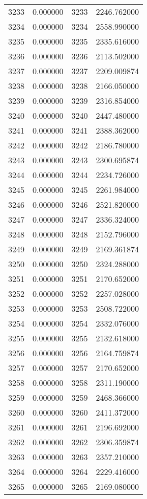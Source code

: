 \documentclass[12pt]{article}
\begin{document}
\begin{longtable}{@{}cccc@{}}
3233 & 0.000000 & 3233 & 2246.762000 \\
3234 & 0.000000 & 3234 & 2558.990000 \\
3235 & 0.000000 & 3235 & 2335.616000 \\
3236 & 0.000000 & 3236 & 2113.502000 \\
3237 & 0.000000 & 3237 & 2209.009874 \\
3238 & 0.000000 & 3238 & 2166.050000 \\
3239 & 0.000000 & 3239 & 2316.854000 \\
3240 & 0.000000 & 3240 & 2447.480000 \\
3241 & 0.000000 & 3241 & 2388.362000 \\
3242 & 0.000000 & 3242 & 2186.780000 \\
3243 & 0.000000 & 3243 & 2300.695874 \\
3244 & 0.000000 & 3244 & 2234.726000 \\
3245 & 0.000000 & 3245 & 2261.984000 \\
3246 & 0.000000 & 3246 & 2521.820000 \\
3247 & 0.000000 & 3247 & 2336.324000 \\
3248 & 0.000000 & 3248 & 2152.796000 \\
3249 & 0.000000 & 3249 & 2169.361874 \\
3250 & 0.000000 & 3250 & 2324.288000 \\
3251 & 0.000000 & 3251 & 2170.652000 \\
3252 & 0.000000 & 3252 & 2257.028000 \\
3253 & 0.000000 & 3253 & 2508.722000 \\
3254 & 0.000000 & 3254 & 2332.076000 \\
3255 & 0.000000 & 3255 & 2132.618000 \\
3256 & 0.000000 & 3256 & 2164.759874 \\
3257 & 0.000000 & 3257 & 2170.652000 \\
3258 & 0.000000 & 3258 & 2311.190000 \\
3259 & 0.000000 & 3259 & 2468.366000 \\
3260 & 0.000000 & 3260 & 2411.372000 \\
3261 & 0.000000 & 3261 & 2196.692000 \\
3262 & 0.000000 & 3262 & 2306.359874 \\
3263 & 0.000000 & 3263 & 2357.210000 \\
3264 & 0.000000 & 3264 & 2229.416000 \\
3265 & 0.000000 & 3265 & 2169.080000 \\

\end{longtable}
\end{document}
